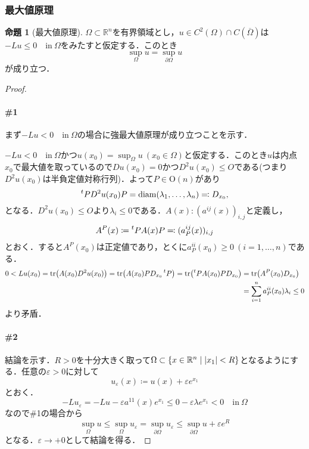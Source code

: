 \documentclass[a4paper]{ltjsarticle}
\newcommand{\Rset}{\mathbb{R}}
\newcommand{\transpose}[1]{\prescript{t}{}{#1}}
\newcommand{\Om}{\Omega}
\newcommand{\pOm}{\partial\Omega}
\newcommand{\Ombar}{\overline{\Omega}}
\newcommand{\inn}{\quad\text{in}\ }
\newcommand{\1}{\mathbbm{1}}
\DeclareMathOperator{\diam}{\mathrm{diam}}
\numberwithin{equation}{section}
\theoremstyle{definition}
\newtheorem{prop}[thm]{命題}
\begin{document}
\subsubsection{最大値原理}
\begin{prop}[最大値原理]
    $\Om\subset \Rset^n$を有界領域とし，$u\in C^2(\Om)\cap C(\Ombar)$は$-Lu\leq 0\inn \Om$をみたすと仮定する．このとき
    \begin{equation}
        \sup_{\Om}u=\sup_{\pOm}u 
    \end{equation}
    が成り立つ．
\end{prop}
\begin{proof}
    \paragraph*{\#1}まず$-Lu<0\inn \Om$の場合に強最大値原理が成り立つことを示す．

    $-Lu<0\inn\Om$かつ$u(x_0)=\sup_{\Om}u\ (x_0\in\Om)$と仮定する．このとき$u$は内点$x_0$で最大値を取っているので$Du(x_0)=0$かつ$D^2u(x_0)\leq O$である(つまり$D^2u(x_0)$は半負定値対称行列)．よって$P\in \mathrm{O}(n)$があり
    \begin{equation}
        \transpose{P}D^2u(x_0)P=\diam(\lambda_1,\ldots,\lambda_n)\eqqcolon D_{x_0},
    \end{equation}
    となる．$D^2u(x_0)\leq O$より$\lambda_i\leq0$である．$A(x)\colon (a^{ij}(x))_{i,j}$と定義し，
    \begin{equation}
        A^{P}(x)\coloneqq \transpose{P}A(x)P\eqqcolon (a_P^{ij}(x))_{i,j}
    \end{equation}
    とおく．すると$A^P(x_0)$は正定値であり，とくに$a_P^{ii}(x_0)\geq 0\ (i=1,\ldots,n)$である．
    \begin{align}
        0<Lu(x_0)=\tr(A(x_0)D^2u(x_0))=\tr(A(x_0)PD_{x_0}\transpose{P})=\tr(\transpose{P}A(x_0)PD_{x_0})&=\tr(A^P(x_0)D_{x_0})\\
        &=\sum_{i=1}^n a^{ii}_P(x_0)\lambda_i\leq0
    \end{align}
    より矛盾．

    \paragraph*{\#2}結論を示す．$R>0$を十分大きく取って$\Om\subset \qty{x\in\Rset^n\mid \abs{x_1}< R}$となるようにする．任意の$\varepsilon>0$に対して
    \begin{equation}
        u_{\varepsilon}(x)\coloneqq u(x)+\varepsilon e^{x_1}
    \end{equation}
    とおく．
    \begin{equation}
        -Lu_{\varepsilon}=-Lu-\varepsilon a^{11}(x)e^{x_1}\leq 0-\varepsilon\lambda e^{x_1}<0 \inn\Om 
    \end{equation}
    なので\#1の場合から
    \begin{equation}
        \sup_{\Om}u\leq \sup_{\Om}u_{\varepsilon}=\sup_{\pOm}u_{\varepsilon}\leq \sup_{\pOm}u+\varepsilon e^{R}
    \end{equation}
    となる．$\varepsilon\to +0$として結論を得る．
\end{proof}
\end{document}
